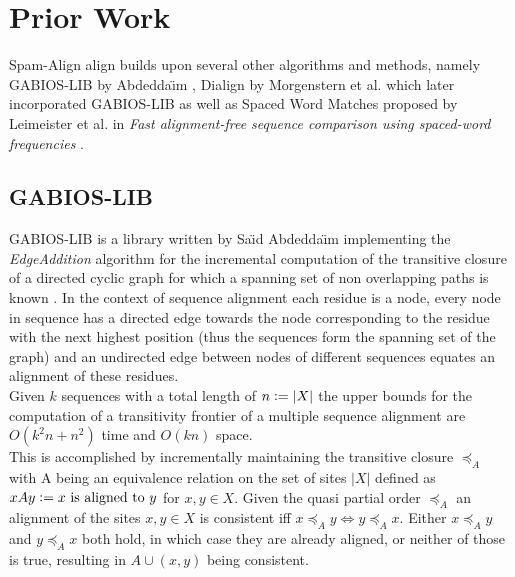 \chapter{Prior Work}
Spam-Align align builds upon several other algorithms and methods, namely GABIOS-LIB by Abdedda{\"\i}m \cite{abdeddaim1997incremental}, Dialign by Morgenstern et al. \cite{morgenstern1996multiple} which later incorporated GABIOS-LIB \cite{abdeddaim2000speeding} as well as Spaced Word Matches proposed by Leimeister et al. in \textit{Fast alignment-free sequence comparison using spaced-word frequencies} \cite{leimeister2014fast}.

\section{GABIOS-LIB}

GABIOS-LIB is a library written by Sa{\"\i}d Abdedda{\"\i}m implementing the \textit{EdgeAddition} algorithm for the incremental computation of the transitive closure of a directed cyclic graph for which a spanning set of non overlapping paths is known \cite{abdeddaim1997incremental}. In the context of sequence alignment each residue is a node, every node in sequence has a directed edge towards the node corresponding to the residue with the next highest position (thus the sequences form the spanning set of the graph) and an undirected edge between nodes of different sequences equates an alignment of these residues.\\
Given $k$ sequences with a total length of $n \vcentcolon= |X|$ the upper bounds for the computation of a transitivity frontier of a multiple sequence alignment are $O(k^2n+n^2)$ time and $O(kn)$ space.\\
This is accomplished by incrementally maintaining the transitive closure $\preceq_A$ with A being an equivalence relation on the set of sites $|X|$ defined as $xAy \vcentcolon= x \text{ is aligned to } y$ for $x,y\in X$. Given the quasi partial order $\preceq_{A}$ an alignment of the sites $x,y\in X$ is consistent iff $x\preceq_{A}y \iff y \preceq_{A} x$. Either $x \preceq_{A} y$ and $y\preceq_{A} x$ both hold, in which case they are already aligned, or neither of those is true, resulting in $A \cup (x,y)$ being consistent.\\


